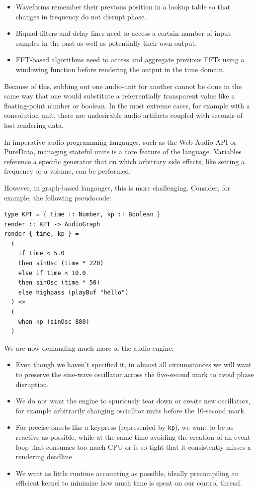 \documentclass{article}
\begin{document}
\begin{itemize}
\item Waveforms remember their previous position in a lookup table so that changes in frequency do not disrupt phase.
\item Biquad filters and delay lines need to access a certain number of input samples in the past as well as potentially their own output.
\item FFT-based algorithms need to access and aggregate previous FFTs using a windowing function before rendering the output in the time domain.
\end{itemize}

Because of this, subbing out one audio-unit for another cannot be done in the same way that one would substitute a referrentially transparent value like a floating-point number or boolean. In the most extreme cases, for example with a convolution unit, there are undesirable audio artifacts coupled with seconds of lost rendering data.

In imperative audio programming langauges, such as the Web Audio API or PureData, managing stateful units is a core feature of the language. Variables reference a specific generator that on which arbitrary side effects, like setting a frequency or a volume, can be performed:

%

However, in graph-based langauges, this is more challenging. Consider, for example, the following pseudocode:

\lstset{language=Haskell, style=psstyle}
\begin{lstlisting}
type KPT = { time :: Number, kp :: Boolean }
render :: KPT -> AudioGraph
render { time, kp } =
  (
    if time < 5.0
    then sinOsc (time * 220)
    else if time < 10.0
    then sinOsc (time * 50)
    else highpass (playBuf "hello")
  ) <>
  (
    when kp (sinOsc 880)
  )
\end{lstlisting}

We are now demanding much more of the audio engine:
\begin{itemize}
\item Even though we haven't specified it, in almost all circumstances we will want to preserve the sine-wave oscillator across the five-second mark to avoid phase disruption.
\item We do not want the engine to spuriously tear down or create new oscillators, for example arbitrarily changing oscialltor units before the 10-second mark.
\item For precise onsets like a keypress (represented by \texttt{kp}), we want to be as reactive as possible, while at the same time avoiding the creation of an event loop that consumes too much CPU or is so tight that it consistently misses a rendering deadline.
\item We want as little runtime accounting as possible, ideally precompiling an efficient kernel to minimize how much time is spent on our control thread.
\end{itemize}
\end{document}
